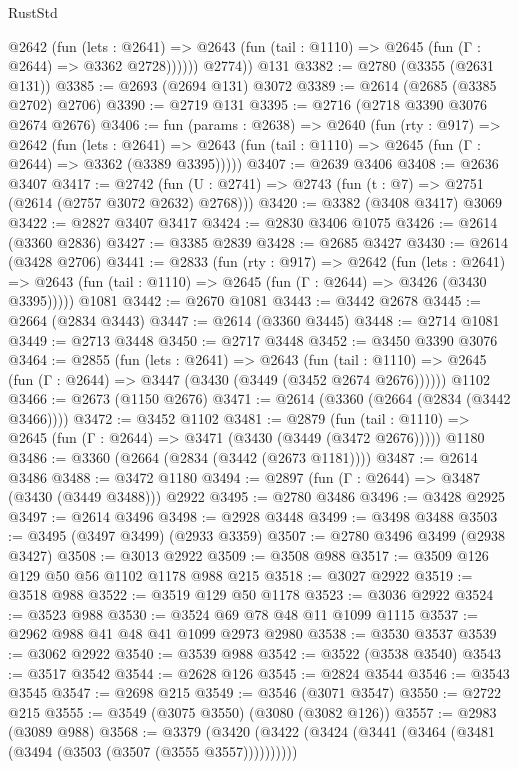\begin{lexlean}{RustStd}
\begin{coremodule}
            @2642
              (fun (lets : @2641) =>
              @2643 (fun (tail : @1110) => @2645 (fun (Γ : @2644) => @3362 @2728))))))
        @2774))
    @131
@3382 := @2780 (@3355 (@2631 @131))
@3385 := @2693 (@2694 @131) @3072
@3389 := @2614 (@2685 (@3385 @2702) @2706)
@3390 := @2719 @131
@3395 := @2716 (@2718 @3390 @3076 @2674 @2676)
@3406 := fun (params : @2638) =>
  @2640
    (fun (rty : @917) =>
    @2642
      (fun (lets : @2641) =>
      @2643 (fun (tail : @1110) => @2645 (fun (Γ : @2644) => @3362 (@3389 @3395)))))
@3407 := @2639 @3406
@3408 := @2636 @3407
@3417 := @2742 (fun (U : @2741) => @2743 (fun (t : @7) => @2751 (@2614 (@2757 @3072 @2632) @2768)))
@3420 := @3382 (@3408 @3417) @3069
@3422 := @2827 @3407 @3417
@3424 := @2830 @3406 @1075
@3426 := @2614 (@3360 @2836)
@3427 := @3385 @2839
@3428 := @2685 @3427
@3430 := @2614 (@3428 @2706)
@3441 := @2833
    (fun (rty : @917) =>
    @2642
      (fun (lets : @2641) =>
      @2643 (fun (tail : @1110) => @2645 (fun (Γ : @2644) => @3426 (@3430 @3395)))))
    @1081
@3442 := @2670 @1081
@3443 := @3442 @2678
@3445 := @2664 (@2834 @3443)
@3447 := @2614 (@3360 @3445)
@3448 := @2714 @1081
@3449 := @2713 @3448
@3450 := @2717 @3448
@3452 := @3450 @3390 @3076
@3464 := @2855
    (fun (lets : @2641) =>
    @2643
      (fun (tail : @1110) => @2645 (fun (Γ : @2644) => @3447 (@3430 (@3449 (@3452 @2674 @2676))))))
    @1102
@3466 := @2673 (@1150 @2676)
@3471 := @2614 (@3360 (@2664 (@2834 (@3442 @3466))))
@3472 := @3452 @1102
@3481 := @2879
    (fun (tail : @1110) => @2645 (fun (Γ : @2644) => @3471 (@3430 (@3449 (@3472 @2676)))))
    @1180
@3486 := @3360 (@2664 (@2834 (@3442 (@2673 @1181))))
@3487 := @2614 @3486
@3488 := @3472 @1180
@3494 := @2897 (fun (Γ : @2644) => @3487 (@3430 (@3449 @3488))) @2922
@3495 := @2780 @3486
@3496 := @3428 @2925
@3497 := @2614 @3496
@3498 := @2928 @3448
@3499 := @3498 @3488
@3503 := @3495 (@3497 @3499) (@2933 @3359)
@3507 := @2780 @3496 @3499 (@2938 @3427)
@3508 := @3013 @2922
@3509 := @3508 @988
@3517 := @3509 @126 @129 @50 @56 @1102 @1178 @988 @215
@3518 := @3027 @2922
@3519 := @3518 @988
@3522 := @3519 @129 @50 @1178
@3523 := @3036 @2922
@3524 := @3523 @988
@3530 := @3524 @69 @78 @48 @11 @1099 @1115
@3537 := @2962 @988 @41 @48 @41 @1099 @2973 @2980
@3538 := @3530 @3537
@3539 := @3062 @2922
@3540 := @3539 @988
@3542 := @3522 (@3538 @3540)
@3543 := @3517 @3542
@3544 := @2628 @126
@3545 := @2824 @3544
@3546 := @3543 @3545
@3547 := @2698 @215
@3549 := @3546 (@3071 @3547)
@3550 := @2722 @215
@3555 := @3549 (@3075 @3550) (@3080 (@3082 @126))
@3557 := @2983 (@3089 @988)
@3568 := @3379 (@3420 (@3422 (@3424 (@3441 (@3464 (@3481 (@3494 (@3503 (@3507 (@3555 @3557))))))))))

\end{coremodule}
\end{lexlean}
